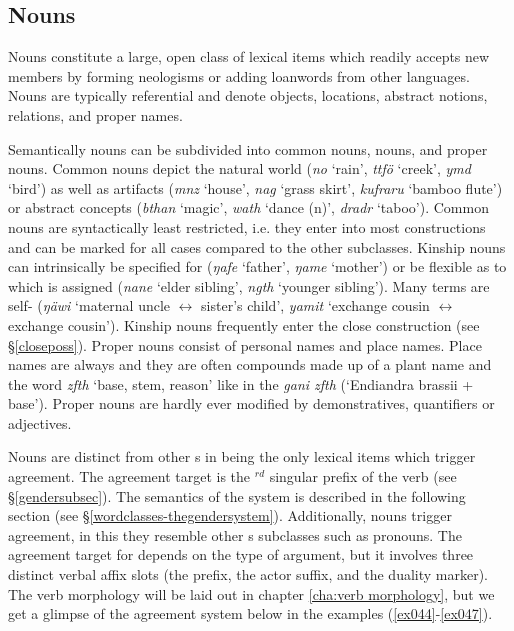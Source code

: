 \subsection{Nouns} \label{nouns}

Nouns constitute a large, open class of lexical items which readily accepts new members by forming neologisms or adding loanwords from other languages. Nouns are typically referential and denote objects, locations, abstract notions,  relations, and proper names.%

Semantically nouns can be subdivided into common nouns,  nouns, and proper nouns. Common nouns depict the natural world (\emph{no} `rain', \emph{ttfö} `creek', \emph{ymd} `bird') as well as artifacts (\emph{mnz} `house', \emph{nag} `grass skirt', \emph{kufraru} `bamboo flute') or abstract concepts (\emph{bthan} `magic', \emph{wath} `dance (n)', \emph{dradr} `taboo'). Common nouns are syntactically least restricted, i.e. they enter into most constructions and can be marked for all cases compared to the other  subclasses. Kinship nouns can intrinsically be specified for  (\emph{ŋafe} `father', \emph{ŋame} `mother') or be flexible as to which  is assigned (\emph{nane} `elder sibling', \emph{ngth} `younger sibling'). Many  terms are self- (\emph{ŋäwi} `maternal uncle $\leftrightarrow$ sister's child', \emph{yamit} `exchange cousin $\leftrightarrow$ exchange cousin'). Kinship nouns frequently enter the close  construction (see \S{}\ref{closeposs}). Proper nouns consist of personal names and place names. Place names are always  and they are often compounds made up of a plant name and the word \emph{zfth} `base, stem, reason' like in the  \emph{gani zfth} (`Endiandra brassii + base'). Proper nouns are hardly ever modified by demonstratives, quantifiers or adjectives.%

Nouns are distinct from other s in being the only lexical items which trigger  agreement. The agreement target is the \Third{}$^{rd}$  singular prefix of the verb (see \S{}\ref{gendersubsec}). The semantics of the  system is described in the following section (see \S{}\ref{wordclasses-thegendersystem}). Additionally, nouns trigger  agreement, in this they resemble other s subclasses such as pronouns. The agreement target for  depends on the type of argument, but it involves three distinct verbal affix slots (the  prefix, the actor suffix, and the duality marker). The verb morphology will be laid out in chapter \ref{cha:verb morphology}, but we get a glimpse of the agreement system below in the examples (\ref{ex044}-\ref{ex047}).%

